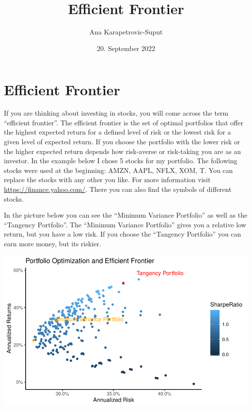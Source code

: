 \documentclass[
]{article}
\title{Efficient Frontier}
\author{Ana Karapetrovic-Suput}
\date{20. September 2022}
\begin{document}
\maketitle

\newpage 
\tableofcontents 
\listoftables
\newpage

\hypertarget{efficient-frontier}{%
\section{Efficient Frontier}\label{efficient-frontier}}

If you are thinking about investing in stocks, you will come across the
term ``efficient frontier''. The efficient frontier is the set of
optimal portfolios that offer the highest expected return for a defined
level of risk or the lowest risk for a given level of expected return.
If you choose the portfolio with the lower risk or the higher expected
return depends how risk-averse or risk-taking you are as an investor. In
the example below I chose 5 stocks for my portfolio. The following
stocks were used at the beginning: AMZN, AAPL, NFLX, XOM, T. You can
replace the stocks with any other you like. For more information visit
\url{https://finance.yahoo.com/}. There you can also find the symbols of
different stocks.

In the picture below you can see the ``Minimum Variance Portfolio'' as
well as the ``Tangency Portfolio''. The ``Minimum Variance Portfolio''
gives you a relative low return, but you have a low risk. If you choose
the ``Tangency Portfolio'' you can earn more money, but its riskier.

\begin{center}\includegraphics{EfficientFrontier_files/figure-latex/plot efficient frontier-1} \end{center}
\end{document}
